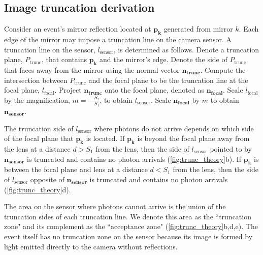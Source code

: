 \subsection{Image truncation derivation} \label{sec:image_truncations}

Consider an event's mirror reflection located at $\bm{p_k}$ generated from mirror $k$.
Each edge of the mirror may impose a truncation line on the camera sensor.
A truncation line on the sensor, $l_\text{sensor}$, is determined as follows.
Denote a truncation plane, $P_{\text{trunc}}$, that contains $\bm{p_k}$ and the 
mirror's edge.
Denote the side of $P_{\text{trunc}}$ that faces away from the mirror using the 
normal vector $\bm{n_{\text{trunc}}}$.
Compute the intersection between $P_{\text{trunc}}$ and the focal plane to be the
truncation line at the focal plane, $l_\text{focal}$.
Project $\bm{n_{\text{trunc}}}$ onto the focal plane, denoted as 
$\bm{n_{\text{focal}}}$.
Scale $l_\text{focal}$ by the magnification, $m=-\frac{S_2}{S_1}$, to obtain $l_\text{sensor}$.
Scale $\bm{n_{\text{focal}}}$ by $m$ to obtain $\bm{n_{\text{sensor}}}$.

The truncation side of $l_\text{sensor}$ where photons do not arrive depends on 
which side of the focal plane that $\bm{p_k}$ is located.
If $\bm{p_k}$ is beyond the focal plane away from the lens at a distance $d>S_1$ 
from the lens, 
then the side of $l_\text{sensor}$ pointed to by $\bm{n_{\text{sensor}}}$ is 
truncated and contains no photon arrivals (\cref{fig:trunc_theory}b).
If $\bm{p_k}$ is between the focal plane and lens at a distance $d<S_1$ from the lens, 
then the side of $l_\text{sensor}$ opposite of $\bm{n_{\text{sensor}}}$ 
is truncated and contains no photon arrivals (\cref{fig:trunc_theory}d).

The area on the sensor where photons cannot arrive is the union of the
truncation sides of each truncation line.
We denote this area as the ``truncation zone" and its complement as the 
``acceptance zone" (\cref{fig:trunc_theory}b,d,e).
The event itself has no truncation zone on the sensor because its image is formed 
by light emitted directly to the camera without reflections.

